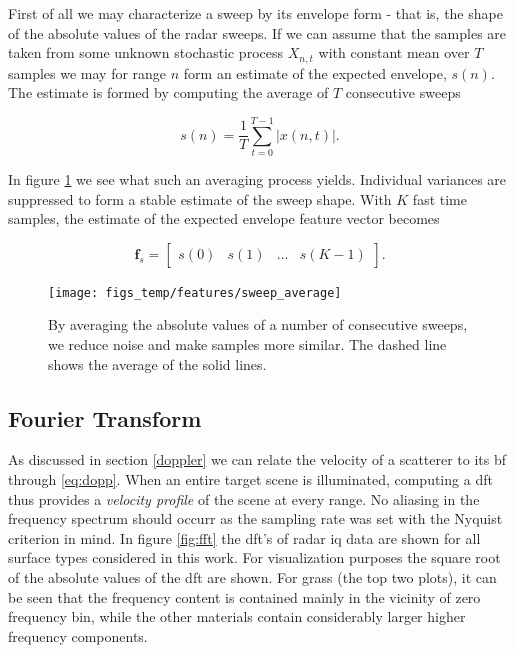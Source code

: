 First of all we may characterize a sweep by its envelope form - that is, the shape of the absolute values of the radar sweeps. If we can assume that the samples are taken from some unknown stochastic process $X_{n,t}$ with constant mean over $T$ samples we may for range $n$ form an estimate of the expected envelope, $s(n)$. The estimate is formed by computing the average of $T$ consecutive sweeps

\begin{equation}
	s(n) = \frac{1}{T}\sum_{t=0}^{T-1}|x(n, t)|.
\end{equation}

In figure \ref{fig:sweep_average} we see what such an averaging process yields. Individual variances are suppressed to form a stable estimate of the sweep shape. With $K$ fast time samples, the estimate of the expected envelope feature vector becomes 

\begin{equation}
	\mathbf{f}_{s} = 
	\begin{bmatrix}
		s(0) & s(1) & ... & s(K-1)
	\end{bmatrix}.
\end{equation}


\begin{figure}[h]
	\centering
	\texttt{[image: figs\_temp/features/sweep\_average]}
	\caption{By averaging the absolute values of a number of consecutive sweeps, we reduce noise and make samples more similar. The dashed line shows the average of the solid lines. }
	\label{fig:sweep_average}
\end{figure}


\subsection{Fourier Transform}

As discussed in section \ref{doppler} we can relate the velocity of a scatterer to its \gls{bf} through \ref{eq:dopp}. When an entire target scene is illuminated, computing a \gls{dft} thus provides a \emph{velocity profile} of the scene at every range. No aliasing in the frequency spectrum should occurr as the sampling rate was set with the Nyquist criterion in mind. In figure \ref{fig:fft} the \gls{dft}'s of radar \gls{iq} data are shown for all surface types considered in this work. For visualization purposes the square root of the absolute values of the \gls{dft} are shown. For grass (the top two plots), it can be seen that the frequency content is contained mainly in the vicinity of zero frequency bin, while the other materials contain considerably larger higher frequency components. %

